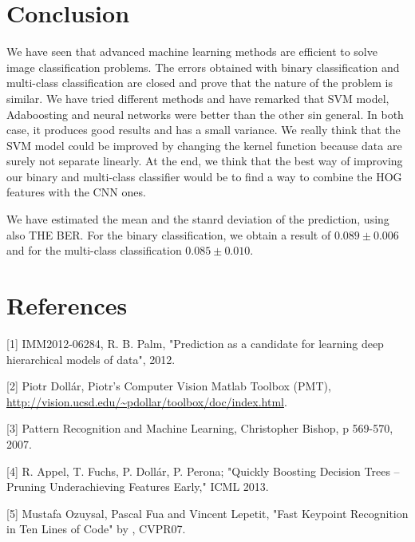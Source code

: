 \documentclass{article} %
\begin{document}
\section{Conclusion}

We have seen that advanced machine learning methods are efficient to solve image classification problems. The errors obtained with binary classification and multi-class classification are closed and prove that the nature of the problem is similar. We have tried different methods and have remarked that SVM model, Adaboosting and neural networks were better than the other sin general. In both case, it produces good results and has a small variance. We really think that the SVM model could be improved by changing the kernel function because data are surely not separate linearly. At the end, we think that the best way of improving our binary and multi-class classifier would be to find a way to combine the HOG features with the CNN ones. 

We have estimated the mean and the stanrd deviation of the prediction, using also THE BER. For the binary classification, we obtain a result of $0.089 \pm 0.006$ and for the multi-class classification $0.085 \pm 0.010$.

\section{References}

[1]    IMM2012-06284, R. B. Palm, "Prediction as a candidate for learning deep hierarchical models of data", 2012.


[2]    Piotr Doll\'ar, {P}iotr's {C}omputer {V}ision {M}atlab {T}oolbox ({PMT}), \url{http://vision.ucsd.edu/~pdollar/toolbox/doc/index.html}. 


[3]    Pattern Recognition and Machine Learning, Christopher Bishop, p 569-570, 2007.


[4]    R. Appel, T. Fuchs, P. Dollár, P. Perona; "Quickly Boosting Decision Trees – Pruning Underachieving Features Early," ICML 2013.


[5]   Mustafa Ozuysal, Pascal Fua and Vincent Lepetit, "Fast Keypoint Recognition in Ten Lines of Code" by , CVPR07.
\end{document}
